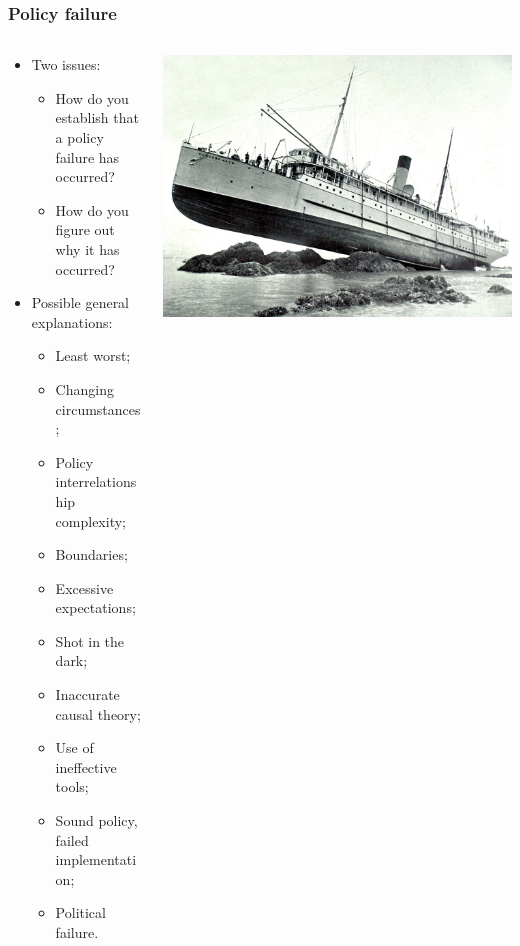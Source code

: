 \documentclass[aspectratio=169]{beamer}
\theoremstyle{principle}
\begin{document}
\begin{frame}
\frametitle{Policy failure}
\begin{columns}
\begin{column}{0.5\textwidth}

\begin{itemize}
\item Two issues:
\begin{itemize}
\item How do you establish that a policy failure has occurred?
\item How do you figure out why it has occurred?
\end{itemize}
\item Possible general explanations:
\begin{itemize}
\item Least worst;
\item Changing circumstances;
\item Policy interrelationship complexity;
\item Boundaries;
\item Excessive expectations;
\item Shot in the dark;
\item Inaccurate causal theory;
\item Use of ineffective tools;
\item Sound policy, failed implementation;
\item Political failure.
\end{itemize}
\end{itemize}
\end{column}
\begin{column}{0.5\textwidth}
    \begin{center}
     \includegraphics[scale=0.1]{ship_on_rocks.jpg}
     \end{center}

\end{column}
\end{columns}

\end{frame}
\end{document}
